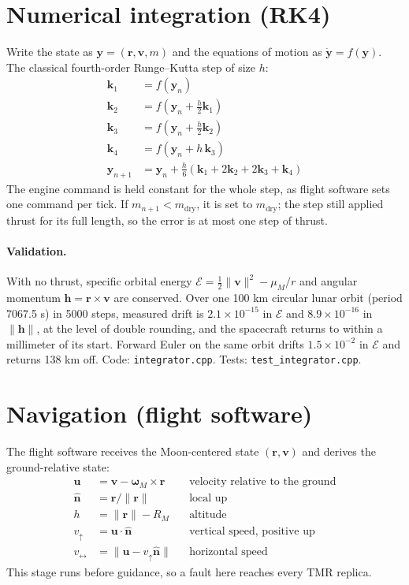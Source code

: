 \documentclass[11pt]{article}
\begin{document}
\section{Numerical integration (RK4)}
Write the state as $\mathbf{y} = (\mathbf{r}, \mathbf{v}, m)$ and the equations of
motion as $\dot{\mathbf{y}} = f(\mathbf{y})$. The classical fourth-order Runge--Kutta
step of size $h$:
\begin{align}
\mathbf{k}_1 &= f(\mathbf{y}_n) \\
\mathbf{k}_2 &= f(\mathbf{y}_n + \tfrac{h}{2}\mathbf{k}_1) \\
\mathbf{k}_3 &= f(\mathbf{y}_n + \tfrac{h}{2}\mathbf{k}_2) \\
\mathbf{k}_4 &= f(\mathbf{y}_n + h\,\mathbf{k}_3) \\
\mathbf{y}_{n+1} &= \mathbf{y}_n + \tfrac{h}{6}\left(\mathbf{k}_1 + 2\mathbf{k}_2 + 2\mathbf{k}_3 + \mathbf{k}_4\right)
\end{align}
The engine command is held constant for the whole step, as flight software sets one
command per tick. If $m_{n+1} < m_{\mathrm{dry}}$, it is set to $m_{\mathrm{dry}}$; the
step still applied thrust for its full length, so the error is at most one step of thrust.

\paragraph{Validation.} With no thrust, specific orbital energy
$\mathcal{E} = \tfrac12\lVert\mathbf{v}\rVert^2 - \mu_M/r$ and angular momentum
$\mathbf{h} = \mathbf{r}\times\mathbf{v}$ are conserved. Over one 100 km circular lunar
orbit (period 7067.5 s) in 5000 steps, measured drift is $2.1\times10^{-15}$ in
$\mathcal{E}$ and $8.9\times10^{-16}$ in $\lVert\mathbf{h}\rVert$, at the level of double
rounding, and the spacecraft returns to within a millimeter of its start. Forward Euler
on the same orbit drifts $1.5\times10^{-2}$ in $\mathcal{E}$ and returns 138 km off.
Code: \texttt{integrator.cpp}. Tests: \texttt{test\_integrator.cpp}.

\section{Navigation (flight software)}
The flight software receives the Moon-centered state $(\mathbf{r}, \mathbf{v})$ and
derives the ground-relative state:
\begin{align}
\mathbf{u} &= \mathbf{v} - \boldsymbol{\omega}_M \times \mathbf{r} &&\text{velocity relative to the ground}\\
\hat{\mathbf{n}} &= \mathbf{r} / \lVert\mathbf{r}\rVert &&\text{local up}\\
h &= \lVert\mathbf{r}\rVert - R_M &&\text{altitude}\\
v_{\uparrow} &= \mathbf{u}\cdot\hat{\mathbf{n}} &&\text{vertical speed, positive up}\\
v_{\leftrightarrow} &= \lVert\mathbf{u} - v_{\uparrow}\hat{\mathbf{n}}\rVert &&\text{horizontal speed}
\end{align}
This stage runs before guidance, so a fault here reaches every TMR replica.
\end{document}
